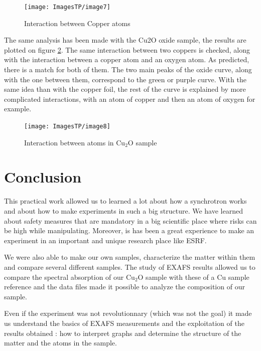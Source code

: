 \documentclass[11pt,a4paper,oneside]{report}
\begin{document}
\begin{figure}[H]
    \begin{center}
        \texttt{[image: ImagesTP/image7]}
        \caption{Interaction between Copper atoms}
        \label{graph4}
    \end{center}
\end{figure}

The same analysis has been made with the Cu2O oxide sample, the results are plotted on figure \ref{graph5}. The same interaction between two coppers is checked, along with the interaction between a copper atom and an oxygen atom. As predicted, there is a match for both of them. The two main peaks of the oxide curve, along with the one between them, correspond to the green or purple curve. With the same idea than with the copper foil, the rest of the curve is explained by more complicated interactions, with an atom of copper and then an atom of oxygen for example.
\begin{figure}[H]
    \begin{center}
        \texttt{[image: ImagesTP/image8]}
        \caption{Interaction between atoms in Cu$_2$O sample}
        \label{graph5}
    \end{center}
\end{figure}

\clearpage
\newpage

\chapter*{Conclusion}

	This practical work allowed us to learned a lot about how a synchrotron works and about how to make experiments in such a big structure. We have learned about safety measures that are mandatory in a big scientific place where risks can be high while manipulating. Moreover, is has been a great experience to make an experiment in an important and unique research place like ESRF.
		
	We were also able to make our own samples, characterize the matter within them and compare several different samples. The study of EXAFS results allowed us to compare the spectral absorption of our Cu$_2$O sample with these of a Cu sample reference and the data files made it possible to analyze the composition of our sample. 
	
	Even if the experiment was not revolutionnary (which was not the goal) it made us understand the basics of EXAFS measurements and the exploitation of the results obtained : how to interpret graphs and determine the structure of the matter and the atoms in the sample.

\nocite{*}


\end{document}
